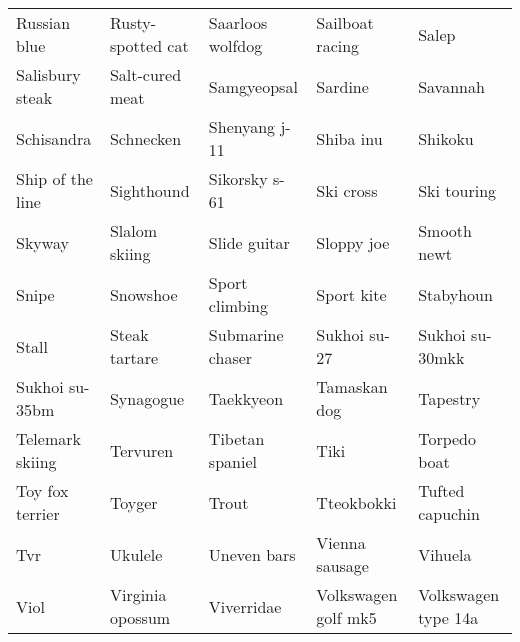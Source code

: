 \documentclass[10pt,journal,compsoc]{IEEEtran}
\begin{document}
\begin{table*}[!h]
\begin{tabular}{lllll}
Russian blue              & Rusty-spotted cat               & Saarloos wolfdog                  & Sailboat racing                            & Salep                              \\
Salisbury steak           & Salt-cured meat                 & Samgyeopsal                       & Sardine                                    & Savannah                           \\
Schisandra                & Schnecken                       & Shenyang j-11                     & Shiba inu                                  & Shikoku                            \\
Ship of the line          & Sighthound                      & Sikorsky s-61                     & Ski cross                                  & Ski touring                        \\
Skyway                    & Slalom skiing                   & Slide guitar                      & Sloppy joe                                 & Smooth newt                        \\
Snipe                     & Snowshoe                        & Sport climbing                    & Sport kite                                 & Stabyhoun                          \\
Stall                     & Steak tartare                   & Submarine chaser                  & Sukhoi su-27                               & Sukhoi su-30mkk                    \\
Sukhoi su-35bm            & Synagogue                       & Taekkyeon                         & Tamaskan dog                               & Tapestry                           \\
Telemark skiing           & Tervuren                        & Tibetan spaniel                   & Tiki                                       & Torpedo boat                       \\
Toy fox terrier           & Toyger                          & Trout                             & Tteokbokki                                 & Tufted capuchin                    \\
Tvr                       & Ukulele                         & Uneven bars                       & Vienna sausage                             & Vihuela                            \\
Viol                      & Virginia opossum                & Viverridae                        & Volkswagen golf mk5                        & Volkswagen type 14a                \\

\end{tabular}
\end{table*}
\end{document}
